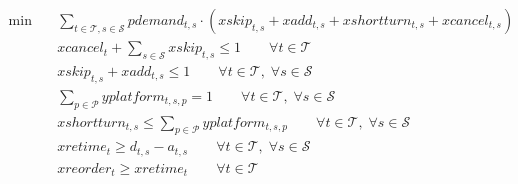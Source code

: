 \begin{align}
  \min\quad & \sum_{t \in \mathcal{T}, s \in \mathcal{S}} pdemand_{t,s} \cdot (xskip_{t,s} + xadd_{t,s} + xshortturn_{t,s} + xcancel_{t,s}) \tag{passengerdelays} \\
  & xcancel_t + \sum_{s \in \mathcal{S}} xskip_{t,s} \le 1 \qquad \forall t \in \mathcal{T} \tag{traincancelling} \\
  & xskip_{t,s} + xadd_{t,s} \le 1 \qquad \forall t \in \mathcal{T},\; \forall s \in \mathcal{S} \tag{stopskipping} \\
  & \sum_{p \in \mathcal{P}} yplatform_{t,s,p} = 1 \qquad \forall t \in \mathcal{T},\; \forall s \in \mathcal{S} \tag{platformallocation} \\
  & xshortturn_{t,s} \le \sum_{p \in \mathcal{P}} yplatform_{t,s,p} \qquad \forall t \in \mathcal{T},\; \forall s \in \mathcal{S} \tag{shortturning} \\
  & xretime_{t} \ge d_{t,s} - a_{t,s} \qquad \forall t \in \mathcal{T},\; \forall s \in \mathcal{S} \tag{retiming} \\
  & xreorder_{t} \ge xretime_{t} \qquad \forall t \in \mathcal{T} \tag{reordering} \\
\end{align}